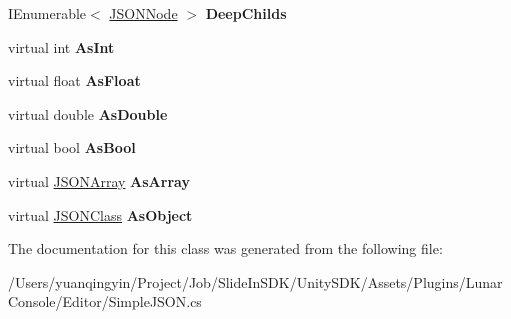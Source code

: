 \begin{DoxyCompactItemize}
I\+Enumerable$<$ \mbox{\hyperlink{class_lunar_console_editor_internal_1_1_j_s_o_n_node}{J\+S\+O\+N\+Node}} $>$ {\bfseries Deep\+Childs}
\item 
\mbox{\label{class_lunar_console_editor_internal_1_1_j_s_o_n_node_a3f6d10a6417a08faf78944c327e119a3}} 
virtual int {\bfseries As\+Int}
\item 
\mbox{\label{class_lunar_console_editor_internal_1_1_j_s_o_n_node_a8c9a3d5cd6e4c1f37057eeec37fe9aab}} 
virtual float {\bfseries As\+Float}
\item 
\mbox{\label{class_lunar_console_editor_internal_1_1_j_s_o_n_node_a2bf0ca80e3f0be40e4c3618bdbc82869}} 
virtual double {\bfseries As\+Double}
\item 
\mbox{\label{class_lunar_console_editor_internal_1_1_j_s_o_n_node_a7c0053ae89ec881e552c134fea289a01}} 
virtual bool {\bfseries As\+Bool}
\item 
\mbox{\label{class_lunar_console_editor_internal_1_1_j_s_o_n_node_a902c86b168d6700014c3a301efe0928d}} 
virtual \mbox{\hyperlink{class_lunar_console_editor_internal_1_1_j_s_o_n_array}{J\+S\+O\+N\+Array}} {\bfseries As\+Array}
\item 
\mbox{\label{class_lunar_console_editor_internal_1_1_j_s_o_n_node_a4dcf163a4ad006a712e1d07f60a01fc2}} 
virtual \mbox{\hyperlink{class_lunar_console_editor_internal_1_1_j_s_o_n_class}{J\+S\+O\+N\+Class}} {\bfseries As\+Object}
\end{DoxyCompactItemize}


The documentation for this class was generated from the following file\+:\begin{DoxyCompactItemize}
\item 
/\+Users/yuanqingyin/\+Project/\+Job/\+Slide\+In\+S\+D\+K/\+Unity\+S\+D\+K/\+Assets/\+Plugins/\+Lunar\+Console/\+Editor/Simple\+J\+S\+O\+N.\+cs\end{DoxyCompactItemize}
